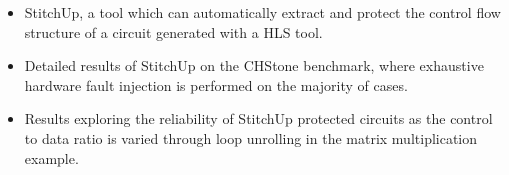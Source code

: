 \vspace{-4pt}
\begin{itemize}
	\setlength{\itemsep}{1pt}
	\setlength{\parskip}{0pt}
	\setlength{\parsep}{0pt}
	\item StitchUp, a tool which can automatically extract and protect the control flow structure of a circuit generated with a HLS tool.
	\item Detailed results of StitchUp on the CHStone benchmark, where exhaustive hardware fault injection is performed on the majority of cases.
	\item Results exploring the reliability of StitchUp protected circuits as the control to data ratio is varied through
	loop unrolling in the matrix multiplication example.
\end{itemize}
%
%
